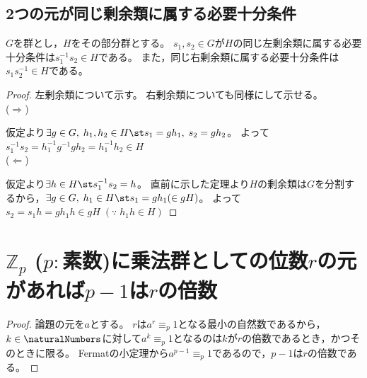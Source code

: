         \subsection{2つの元が同じ剰余類に属する必要十分条件}
            $G$を群とし，$H$をその部分群とする。
            $s_1,s_2\in G$が$H$の同じ左剰余類に属する必要十分条件は$s_1^{-1}s_2\in H$である。
            また，同じ右剰余類に属する必要十分条件は$s_1s_2^{-1}\in H$である。
            \begin{proof}
                \quad\par
                左剰余類について示す。
                右剰余類についても同様にして示せる。\\
                ($\Rightarrow$)
                \par
                仮定より$\exists g \in G,\;h_1,h_2 \in H \st s_1 = gh_1,\;s_2 = gh_2$。
                よって$s_1^{-1}s_2 = h_1^{-1}g^{-1}gh_2 = h_1^{-1}h_2 \in H$\\
                ($\Leftarrow$)
                \par
                仮定より$\exists h \in H \st s_1^{-1}s_2 = h$。
                直前に示した定理より$H$の剰余類は$G$を分割するから，$\exists g\in G,\;h_1\in H \st s_1 = gh_1 (\in gH)$。
                よって$s_2 = s_1h = gh_1h \in gH\;(\because\; h_1h \in H)$
            \end{proof}
        \section{\texorpdfstring{$\mathbb{Z}_p$}{Zp} (\texorpdfstring{$p: $}{p: }素数)に乗法群としての位数\texorpdfstring{$r$}{r}の元があれば\texorpdfstring{$p-1$}{p-1}は\texorpdfstring{$r$}{r}の倍数}
            \begin{proof}
                \quad\par
                論題の元を$a$とする。
                $r$は$a^r \equiv_p 1$となる最小の自然数であるから，$k\in\naturalNumbers$に対して$a^k \equiv_p 1$となるのは$k$が$r$の倍数であるとき，かつそのときに限る。
                Fermatの小定理から$a^{p-1} \equiv_p 1$であるので，$p-1$は$r$の倍数である。
            \end{proof}